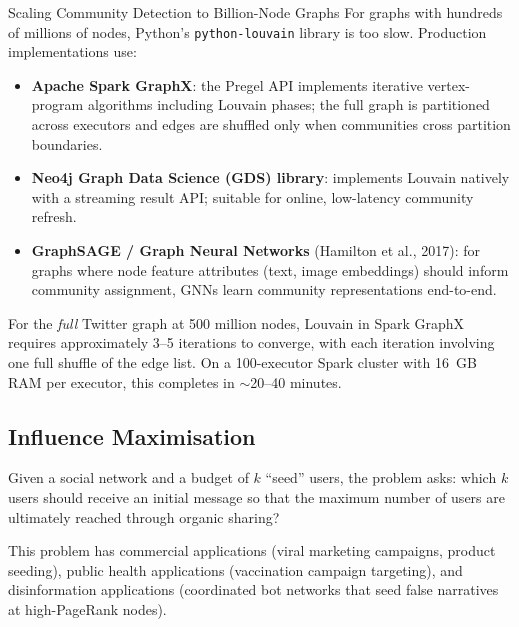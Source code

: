 \begin{systemdesign}{Scaling Community Detection to Billion-Node Graphs}
For graphs with hundreds of millions of nodes, Python's
\texttt{python-louvain} library is too slow. Production implementations use:
\begin{itemize}
  \item \textbf{Apache Spark GraphX}: the Pregel API implements
        iterative vertex-program algorithms including Louvain phases;
        the full graph is partitioned across executors and edges are
        shuffled only when communities cross partition boundaries.
  \item \textbf{Neo4j Graph Data Science (GDS) library}: implements
        Louvain natively with a streaming result API; suitable for
        online, low-latency community refresh.
  \item \textbf{GraphSAGE / Graph Neural Networks} (Hamilton et al.,
        2017): for graphs where node feature attributes (text, image
        embeddings) should inform community assignment, GNNs learn
        community representations end-to-end.
\end{itemize}
For the \emph{full} Twitter graph at 500 million nodes, Louvain in
Spark GraphX requires approximately 3--5 iterations to converge,
with each iteration involving one full shuffle of the edge list.
On a 100-executor Spark cluster with 16~GB RAM per executor, this
completes in $\sim$20--40 minutes.
\end{systemdesign}

\subsection{Influence Maximisation}
\label{subsec:influence}

Given a social network and a budget of $k$ ``seed'' users, the
 problem asks: which $k$ users should
receive an initial message so that the maximum number of users are
ultimately reached through organic sharing?

This problem has commercial applications (viral marketing campaigns,
product seeding), public health applications (vaccination campaign
targeting), and disinformation applications (coordinated bot networks
that seed false narratives at high-PageRank nodes).

